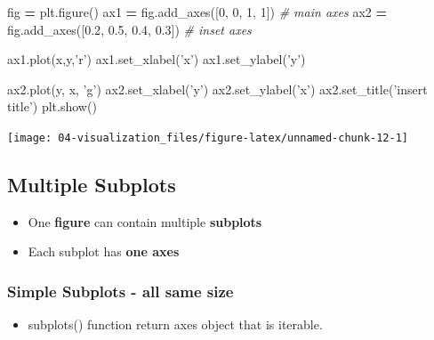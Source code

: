 \documentclass[
]{book}
\newenvironment{Shaded}{\begin{snugshade}}{\end{snugshade}}
\newcommand{\CommentTok}[1]{\textcolor[rgb]{0.37,0.37,0.37}{\textit{#1}}}
\newcommand{\DecValTok}[1]{\textcolor[rgb]{0.06,0.06,0.06}{#1}}
\newcommand{\FloatTok}[1]{\textcolor[rgb]{0.06,0.06,0.06}{#1}}
\newcommand{\NormalTok}[1]{#1}
\newcommand{\OperatorTok}[1]{\textcolor[rgb]{0.43,0.43,0.43}{\textbf{#1}}}
\newcommand{\StringTok}[1]{\textcolor[rgb]{0.5,0.5,0.5}{#1}}
\providecommand{\tightlist}{%
  \setlength{\itemsep}{0pt}\setlength{\parskip}{0pt}}
\begin{document}
\begin{Shaded}
\begin{Highlighting}[]
\NormalTok{fig }\OperatorTok{=}\NormalTok{ plt.figure()}
\NormalTok{ax1 }\OperatorTok{=}\NormalTok{ fig.add_axes([}\DecValTok{0}\NormalTok{, }\DecValTok{0}\NormalTok{, }\DecValTok{1}\NormalTok{, }\DecValTok{1}\NormalTok{])         }\CommentTok{# main axes}
\NormalTok{ax2 }\OperatorTok{=}\NormalTok{ fig.add_axes([}\FloatTok{0.2}\NormalTok{, }\FloatTok{0.5}\NormalTok{, }\FloatTok{0.4}\NormalTok{, }\FloatTok{0.3}\NormalTok{]) }\CommentTok{# inset axes}

\NormalTok{ax1.plot(x,y,}\StringTok{'r'}\NormalTok{)}
\NormalTok{ax1.set_xlabel(}\StringTok{'x'}\NormalTok{)}
\NormalTok{ax1.set_ylabel(}\StringTok{'y'}\NormalTok{)}

\NormalTok{ax2.plot(y, x, }\StringTok{'g'}\NormalTok{)}
\NormalTok{ax2.set_xlabel(}\StringTok{'y'}\NormalTok{)}
\NormalTok{ax2.set_ylabel(}\StringTok{'x'}\NormalTok{)}
\NormalTok{ax2.set_title(}\StringTok{'insert title'}\NormalTok{)}
\NormalTok{plt.show()}
\end{Highlighting}
\end{Shaded}

\texttt{[image: 04-visualization\_files/figure-latex/unnamed-chunk-12-1]}

\hypertarget{multiple-subplots-1}{%
\subsection{Multiple Subplots}\label{multiple-subplots-1}}

\begin{itemize}
\tightlist
\item
  One \textbf{figure} can contain multiple \textbf{subplots}\\
\item
  Each subplot has \textbf{one axes}
\end{itemize}

\hypertarget{simple-subplots---all-same-size}{%
\subsubsection{Simple Subplots - all same size}\label{simple-subplots---all-same-size}}

\begin{itemize}
\tightlist
\item
  subplots() function return axes object that is iterable.
\end{itemize}
\end{document}
